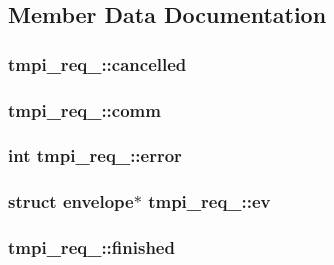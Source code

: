 \subsection{\-Member \-Data \-Documentation}
\hypertarget{structtmpi__req___a94bb550b9907219a52decbd9ba700e88}{
\subsubsection[{cancelled}]{ {\bf tmpi\-\_\-req\-\_\-\-::cancelled}}}\label{structtmpi__req___a94bb550b9907219a52decbd9ba700e88}
\hypertarget{structtmpi__req___a30e27fd4400356a1ff6575ca72d1a989}{
\subsubsection[{comm}]{ {\bf tmpi\-\_\-req\-\_\-\-::comm}}}\label{structtmpi__req___a30e27fd4400356a1ff6575ca72d1a989}
\hypertarget{structtmpi__req___ae23dbe23252a96d9c8d862a028ad84d0}{
\subsubsection[{error}]{\setlength{\rightskip}{0pt plus 5cm}int {\bf tmpi\-\_\-req\-\_\-\-::error}}}\label{structtmpi__req___ae23dbe23252a96d9c8d862a028ad84d0}
\hypertarget{structtmpi__req___abe148223628e06f0cfde20b1cdd0e4cf}{
\subsubsection[{ev}]{\setlength{\rightskip}{0pt plus 5cm}struct {\bf envelope}$\ast$ {\bf tmpi\-\_\-req\-\_\-\-::ev}}}\label{structtmpi__req___abe148223628e06f0cfde20b1cdd0e4cf}
\hypertarget{structtmpi__req___ad3508dc1223626c8722259f45dcaa83c}{
\subsubsection[{finished}]{ {\bf tmpi\-\_\-req\-\_\-\-::finished}}}\label{structtmpi__req___ad3508dc1223626c8722259f45dcaa83c}
